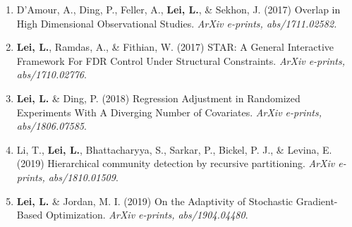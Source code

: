 \documentclass{article}
\begin{document}
\begin{enumerate}
\item D'Amour, A., Ding, P., Feller, A., \textbf{Lei, L.}, \& Sekhon, J. (2017) Overlap in High Dimensional Observational Studies. \emph{ArXiv e-prints, abs/1711.02582.}
\item \textbf{Lei, L.}, Ramdas, A., \& Fithian, W. (2017) STAR: A General Interactive Framework For FDR Control Under Structural Constraints. \emph{ArXiv e-prints, abs/1710.02776}.
\item \textbf{Lei, L.} \& Ding, P. (2018) Regression Adjustment in Randomized Experiments With A Diverging Number of Covariates. \emph{ArXiv e-prints, abs/1806.07585}.
\item Li, T., \textbf{Lei, L.}, Bhattacharyya, S., Sarkar, P., Bickel, P. J., \& Levina, E. (2019) Hierarchical community detection by recursive partitioning. \emph{ArXiv e-prints, abs/1810.01509}.
\item \textbf{Lei, L.} \& Jordan, M. I. (2019) On the Adaptivity of Stochastic Gradient-Based Optimization. \emph{ArXiv e-prints, abs/1904.04480}.
\end{enumerate}


\end{document}
